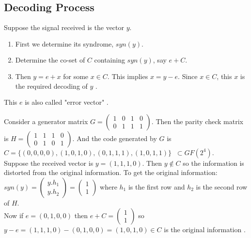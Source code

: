 \subsection{Decoding Process}
Suppose the signal received is the vector \(y\).
\begin{enumerate}
\item First we determine its syndrome, \(syn(y)\).
\item Determine the co-set of \(C\) containing \(syn(y)\), say \(e + C\).
\item Then \(y=e+x\) for some \(x \in C\). This implies \(x=y-e\). Since \(x \in C\), this \(x\) is the required decoding of \(y\) \cite{error_correct}.
\end{enumerate}
This \(e\) is also called "error vector" \cite{error_correct}.
\vspace{2mm}

\begin{example}
  Consider a generator matrix \(G=\begin{pmatrix}
    1 & 0 & 1 & 0\\
    0 & 1 & 1 & 1
  \end{pmatrix}\). Then the parity check matrix is \(H=\begin{pmatrix}
    1 & 1 & 1 & 0\\
    0 & 1 & 0 & 1
  \end{pmatrix}\). And the code generated by \(G\) is  \(C=\{(0,0,0,0),(1,0,1,0),(0,1,1,1),(1,0,1,1)\} \;\; \subset GF(2^{4})\).\\

  Suppose the received vector is \(y=(1,1,1,0)\). Then \(y \not \in C\) so the information is distorted from the original information. To get the original information:\\
  \(syn(y)= \begin{pmatrix}
    y.h_1 \\ y.h_2
  \end{pmatrix} = \begin{pmatrix}
    1 \\ 1
  \end{pmatrix}\) where \(h_1\) is the first row and \(h_2\) is the second row of \(H\).\\
  Now if \(e=(0,1,0,0)\) then \(e+C=\begin{pmatrix}
    1 \\ 1
  \end{pmatrix}\) so \(y-e=(1,1,1,0)-(0,1,0,0)=(1,0,1,0) \in C\) is the original information \cite{error_correct}.

\end{example}


